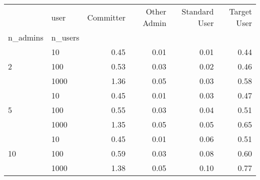 \begin{tabular}{llrrrr}
\toprule
 & user & Committer & Other Admin & Standard User & Target User \\
n_admins & n_users &  &  &  &  \\
\midrule
\multirow[t]{3}{*}{2} & 10 & 0.45 & 0.01 & 0.01 & 0.44 \\
 & 100 & 0.53 & 0.03 & 0.02 & 0.46 \\
 & 1000 & 1.36 & 0.05 & 0.03 & 0.58 \\
\cline{1-6}
\multirow[t]{3}{*}{5} & 10 & 0.45 & 0.01 & 0.03 & 0.47 \\
 & 100 & 0.55 & 0.03 & 0.04 & 0.51 \\
 & 1000 & 1.35 & 0.05 & 0.05 & 0.65 \\
\cline{1-6}
\multirow[t]{3}{*}{10} & 10 & 0.45 & 0.01 & 0.06 & 0.51 \\
 & 100 & 0.59 & 0.03 & 0.08 & 0.60 \\
 & 1000 & 1.38 & 0.05 & 0.10 & 0.77 \\
\cline{1-6}
\bottomrule
\end{tabular}
